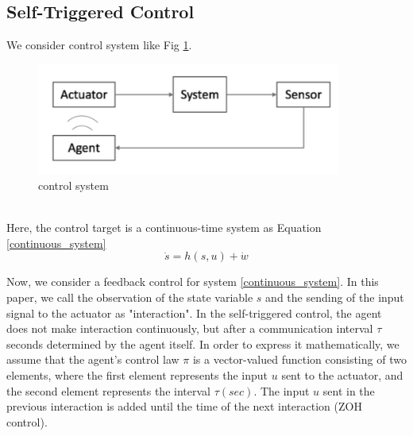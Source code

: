 \documentclass[english, dvipdfmx]{ampmt}             %
\begin{document}
\subsection{Self-Triggered Control}
We consider control system like Fig \ref{image}.
\begin{figure}[h]
	\centering
 	\includegraphics[width=10cm]{event.png}
 	\caption{control system} \label{image}
\end{figure}\\
Here, the control target is a continuous-time system as Equation \eqref{continuous_system}
\begin{equation}
	\dot{s} = h(s,u) + \dot{w}\label{continuous_system}
\end{equation}\par
Now, we consider a feedback control for system \eqref{continuous_system}. In this paper, we call the observation of the state variable $s$ and the sending of the input signal to the actuator as "interaction". In the self-triggered control, the agent does not make interaction continuously, but after a communication interval $\tau$ seconds determined by the agent itself. In order to express it mathematically, we assume that the agent's control law $\pi$ is a vector-valued function consisting of two elements, where the first element represents the input $u$ sent to the actuator, and the second element represents the interval $\tau (sec)$. The input $u$ sent in the previous interaction is added until the time of the next interaction (ZOH control).
\end{document}
